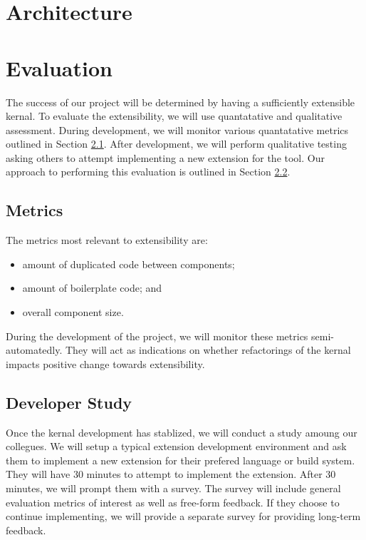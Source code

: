 \documentclass[12pt]{article}
\begin{document}
\section{Architecture}

\section{Evaluation}
The success of our project will be determined by having a sufficiently extensible kernal.
To evaluate the extensibility, we will use quantatative and qualitative assessment.
During development, we will monitor various quantatative metrics outlined in Section \ref{sect:metrics}.
After development, we will perform qualitative testing asking others to attempt implementing a new extension for the tool. Our approach to performing this evaluation is outlined in Section \ref{sect:study}.

\subsection{Metrics}\label{sect:metrics}
The metrics most relevant to extensibility are:
\begin{itemize}
    \item amount of duplicated code between components;
    \item amount of boilerplate code; and
    \item overall component size.
\end{itemize}

During the development of the project, we will monitor these metrics semi-automatedly.
They will act as indications on whether refactorings of the kernal impacts positive change towards extensibility.

\subsection{Developer Study}\label{sect:study}
Once the kernal development has stablized, we will conduct a study amoung our collegues.
We will setup a typical extension development environment and ask them to implement a new extension for their prefered language or build system.
They will have 30 minutes to attempt to implement the extension.
After 30 minutes, we will prompt them with a survey.
The survey will include general evaluation metrics of interest as well as free-form feedback.
If they choose to continue implementing, we will provide a separate survey for providing long-term feedback.
\end{document}
